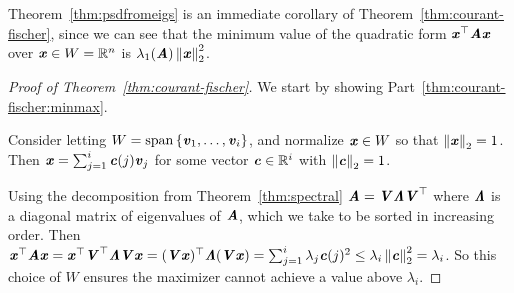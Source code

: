 Theorem~\ref{thm:psdfromeigs} is an immediate corollary of
Theorem~\ref{thm:courant-fischer}, since we can see that the minimum value
of
the quadratic form $\xx^\trp \AA \xx$ over $\xx \in W = \R^n$ is
$\lambda_1(\AA)\norm{\xx}_2^2$.
\begin{proof}[Proof of Theorem~\ref{thm:courant-fischer}]

We start by showing Part~\ref{thm:courant-fischer:minmax}.

Consider letting $W = \Span\setof{\vv_1, \ldots,
  \vv_i}
$, and normalize $\xx \in W$ so that $\norm{\xx}_2 = 1$. Then $\xx = \sum_{j = 1}^i
\cc(j) \vv_j$ for some vector $\cc \in \R^i$ with $\norm{\cc}_2 = 1$.

Using the decomposition from Theorem~\ref{thm:spectral} $\AA=
\VV \LLambda\VV^\trp$ where $\LLambda$ is a diagonal matrix of
eigenvalues of $\AA$, which we take to be sorted in increasing order.
Then $\xx^\trp \AA\xx= \xx^\trp \VV^\trp
\LLambda\VV\xx= (\VV\xx)^\trp  \LLambda(\VV\xx) = \sum_{j = 1}^i
\lambda_j \cc(j)^2 \leq \lambda_i \norm{\cc}_2^2 = \lambda_i $.
So this choice of $W$ ensures the maximizer cannot achieve a value above $\lambda_i$.


\end{proof}
